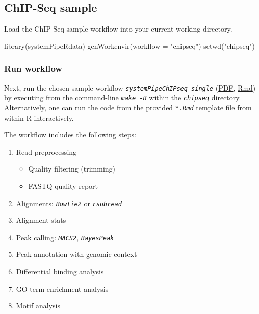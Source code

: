 \documentclass[14pt,]{article}
\providecommand{\tightlist}{%
  \setlength{\itemsep}{0pt}\setlength{\parskip}{0pt}}
\newcommand{\hlstr}[1]{\textcolor[rgb]{0.251,0.627,0.251}{#1}}%
\newcommand{\hlstd}[1]{\textcolor[rgb]{0.251,0.251,0.251}{#1}}%
\newcommand{\hlkwc}[1]{\textcolor[rgb]{0.251,0.251,0.251}{#1}}%
\newcommand{\hlkwd}[1]{\textcolor[rgb]{0.878,0.439,0.125}{#1}}%
\newenvironment{Shaded}{\begin{myshaded}}{\end{myshaded}}
\newcommand{\KeywordTok}[1]{\hlkwd{#1}}
\newcommand{\DataTypeTok}[1]{\hlkwc{#1}}
\newcommand{\StringTok}[1]{\hlstr{#1}}
\newcommand{\NormalTok}[1]{\hlstd{#1}}
\begin{document}
\hypertarget{chip-seq-sample}{%
\subsection{ChIP-Seq sample}\label{chip-seq-sample}}

Load the ChIP-Seq sample workflow into your current working directory.

\begin{Shaded}
\begin{Highlighting}[]
\KeywordTok{library}\NormalTok{(systemPipeRdata)}
\KeywordTok{genWorkenvir}\NormalTok{(}\DataTypeTok{workflow =} \StringTok{"chipseq"}\NormalTok{)}
\KeywordTok{setwd}\NormalTok{(}\StringTok{"chipseq"}\NormalTok{)}
\end{Highlighting}
\end{Shaded}

\hypertarget{run-workflow-1}{%
\subsubsection{Run workflow}\label{run-workflow-1}}

Next, run the chosen sample workflow \emph{\texttt{systemPipeChIPseq\_single}} (\href{https://github.com/tgirke/systemPipeRdata/blob/master/inst/extdata/workflows/chipseq/systemPipeChIPseq.pdf?raw=true}{PDF}, \href{https://github.com/tgirke/systemPipeRdata/blob/master/inst/extdata/workflows/chipseq/systemPipeChIPseq.Rmd}{Rmd}) by executing from the command-line \emph{\texttt{make -B}} within the \emph{\texttt{chipseq}} directory. Alternatively, one can run the code from the provided \emph{\texttt{*.Rmd}} template file from within R interactively.

The workflow includes the following steps:

\begin{enumerate}
\def\labelenumi{\arabic{enumi}.}
\tightlist
\item
  Read preprocessing

  \begin{itemize}
  \tightlist
  \item
    Quality filtering (trimming)
  \item
    FASTQ quality report
  \end{itemize}
\item
  Alignments: \emph{\texttt{Bowtie2}} or \emph{\texttt{rsubread}}
\item
  Alignment stats
\item
  Peak calling: \emph{\texttt{MACS2}}, \emph{\texttt{BayesPeak}}
\item
  Peak annotation with genomic context
\item
  Differential binding analysis
\item
  GO term enrichment analysis
\item
  Motif analysis
\end{enumerate}
\end{document}
